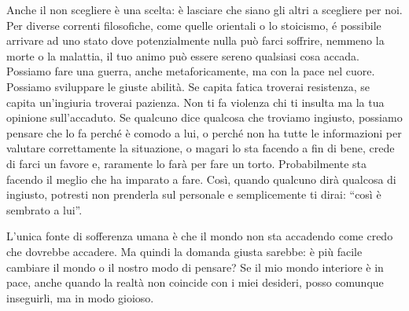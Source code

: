 \documentclass[12pt]{book} %
\begin{document}
Anche il non scegliere è una scelta: è lasciare che siano gli altri a scegliere per noi. Per diverse correnti filosofiche, come quelle orientali o
lo stoicismo, é possibile arrivare ad uno stato dove potenzialmente nulla può farci soffrire, nemmeno la morte
o la malattia, il tuo animo può essere sereno qualsiasi cosa accada. Possiamo fare una guerra, anche metaforicamente, ma con la pace nel cuore. Possiamo sviluppare le giuste abilità. Se capita fatica troverai resistenza, se
capita un'ingiuria troverai pazienza. Non ti fa violenza chi ti insulta ma la tua opinione
sull'accaduto. Se qualcuno dice qualcosa che troviamo ingiusto, possiamo pensare che lo fa perché
è comodo a lui, o perché non ha tutte le informazioni per valutare correttamente la situazione, o magari lo sta facendo a fin di bene, crede di farci un favore e, raramente lo farà per fare un torto. Probabilmente sta facendo il meglio che ha imparato a fare. 
Così, quando qualcuno dirà qualcosa di ingiusto, potresti non prenderla sul personale e semplicemente ti dirai: “così è sembrato a lui”.

L'unica fonte di sofferenza umana è che il mondo non sta accadendo come credo che dovrebbe accadere. Ma quindi la domanda giusta sarebbe: è più facile cambiare il mondo o il nostro modo di pensare? Se il mio mondo interiore è in pace, anche quando la realtà non coincide con i miei desideri, posso comunque inseguirli, ma in modo gioioso.
\end{document}
